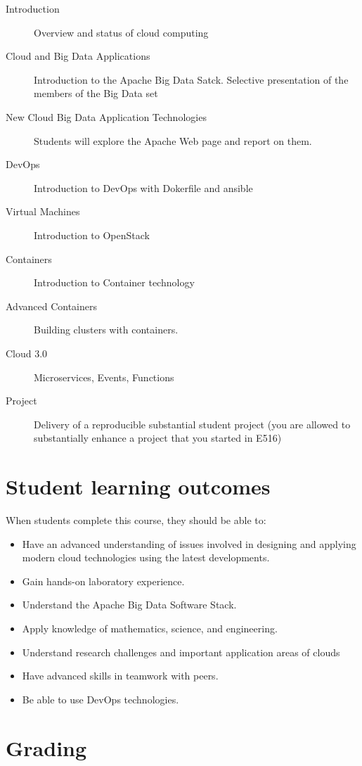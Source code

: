 \begin{description}

\item[Introduction] Overview and status of cloud computing
\item[Cloud and Big Data Applications] Introduction to the Apache Big Data
  Satck. Selective presentation of the members of the Big Data set
\item[New Cloud Big Data Application Technologies] Students will
  explore the Apache Web page and report on them.
\item[DevOps] Introduction to DevOps with Dokerfile and ansible
\item[Virtual Machines] Introduction to OpenStack
\item[Containers] Introduction to Container technology
\item[Advanced Containers] Building clusters with containers.
\item[Cloud 3.0] Microservices, Events, Functions  
\item[Project] Delivery of a reproducible substantial student project 
 (you are allowed to substantially enhance a project that you started
  in E516)

\end{description}

\section{Student learning outcomes}

When students complete this course, they should be able to:

\begin{itemize}
\item	Have an advanced understanding of issues involved in designing and applying modern cloud technologies using the latest developments.
\item	Gain hands-on laboratory experience.
\item	Understand the Apache Big Data Software Stack.
\item	Apply knowledge of mathematics, science, and engineering.
\item	Understand research challenges and important application areas of clouds
\item	Have advanced skills in teamwork with peers.
\item Be able to use DevOps technologies.
\end{itemize}

\section{Grading}

